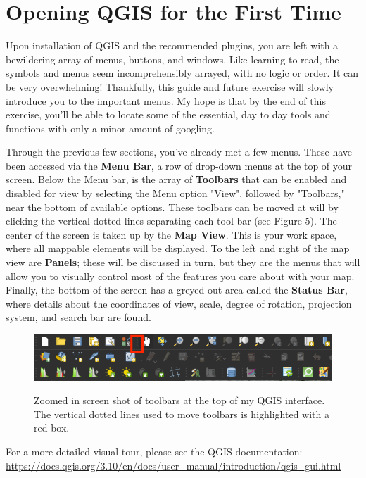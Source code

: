 \documentclass{article}
\begin{document}
\section{Opening QGIS for the First Time}

Upon installation of QGIS and the recommended plugins, you are left with a bewildering array of menus, buttons, and windows. Like learning to read, the symbols and menus seem incomprehensibly arrayed, with no logic or order. It can be very overwhelming! Thankfully, this guide and future exercise will slowly introduce you to the important menus. My hope is that by the end of this exercise, you'll be able to locate some of the essential, day to day tools and functions with only a minor amount of googling. 

Through the previous few sections, you've already met a few menus. These have been accessed via the \textbf{Menu Bar}, a row of drop-down menus at the top of your screen. Below the Menu bar, is the array of \textbf{Toolbars} that can be enabled and disabled for view by selecting the Menu option "View", followed by "Toolbars," near the bottom of available options. These toolbars can be moved at will by clicking the vertical dotted lines separating each tool bar (see Figure 5). The center of the screen is taken up by the \textbf{Map View}. This is your work space, where all mappable elements will be displayed. To the left and right of the map view are \textbf{Panels}; these will be discussed in turn, but they are the menus that will allow you to visually control most of the features you care about with your map. Finally, the bottom of the screen has a greyed out area called the \textbf{Status Bar}, where details about the coordinates of view, scale, degree of rotation, projection system, and search bar are found. 

\begin{figure}[htbp]
    \centering
    \includegraphics[width=\textwidth]{Fig_6_Toolbars.png}
    \label{fig6}
    \caption{Zoomed in screen shot of toolbars at the top of my QGIS interface. The vertical dotted lines used to move toolbars is highlighted with a red box.}
\end{figure}

For a more detailed visual tour, please see the QGIS documentation: \url{https://docs.qgis.org/3.10/en/docs/user_manual/introduction/qgis_gui.html}
\end{document}
